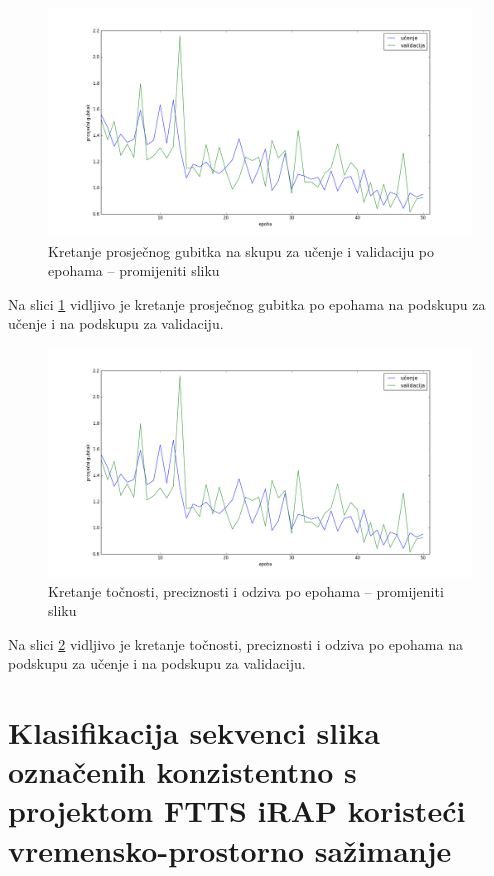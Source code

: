 \documentclass[times, utf8, diplomski, numeric]{fer}
\begin{document}
\begin{figure}[H]
\centering
\includegraphics[scale=0.35]{images/single_irap_700x280_loss.png}
\caption{Kretanje prosječnog gubitka na skupu za učenje i validaciju po epohama -- promijeniti sliku}
\label{img:single_irap_700x280_loss}
\end{figure}
\noindent Na slici \ref{img:single_irap_700x280_loss} vidljivo je kretanje prosječnog gubitka po epohama na podskupu za učenje i na podskupu za validaciju.

\begin{figure}[H]
\centering
\includegraphics[scale=0.35]{images/single_irap_700x280_acc_ap.png}
\caption{Kretanje točnosti, preciznosti i odziva po epohama -- promijeniti sliku}
\label{img:single_irap_700x280_acc_ap}
\end{figure}
\noindent Na slici \ref{img:single_irap_700x280_acc_ap} vidljivo je kretanje točnosti, preciznosti i odziva po epohama na podskupu za učenje i na podskupu za validaciju.

\section{Klasifikacija sekvenci slika označenih konzistentno s projektom FTTS iRAP koristeći vremensko-prostorno sažimanje}
\end{document}
